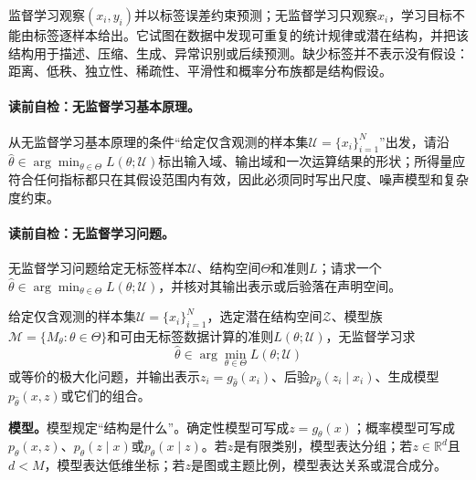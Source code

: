 \label{struct:V4-C01-CH06}
监督学习观察$(x_i,y_i)$并以标签误差约束预测；无监督学习只观察$x_i$，学习目标不能由标签逐样本给出。它试图在数据中发现可重复的统计规律或潜在结构，并把该结构用于描述、压缩、生成、异常识别或后续预测。缺少标签并不表示没有假设：距离、低秩、独立性、稀疏性、平滑性和概率分布族都是结构假设。

\paragraph{读前自检：无监督学习基本原理。}从无监督学习基本原理的条件“给定仅含观测的样本集$\mathcal U=\{x_i\}_{i=1}^{N}$”出发，请沿$\widehat\theta\in\arg\min_{\theta\in\Theta}L(\theta;\mathcal U)$标出输入域、输出域和一次运算结果的形状；所得量应符合任何指标都只在其假设范围内有效，因此必须同时写出尺度、噪声模型和复杂度约束。\par

\label{struct:V4-C01-CH07}
\paragraph{读前自检：无监督学习问题。}无监督学习问题给定无标签样本$\mathcal U$、结构空间$\Theta$和准则$L$；请求一个$\widehat\theta\in\arg\min_{\theta\in\Theta}L(\theta;\mathcal U)$，并核对其输出表示或后验落在声明空间。\par

\begin{definition}[无监督学习问题]\label{def:V4-C01-unsupervised}
给定仅含观测的样本集$\mathcal U=\{x_i\}_{i=1}^{N}$，选定潜在结构空间$\mathcal Z$、模型族$\mathcal M=\{M_\theta:\theta\in\Theta\}$和可由无标签数据计算的准则$L(\theta;\mathcal U)$，无监督学习求
\[
\widehat\theta\in\arg\min_{\theta\in\Theta}L(\theta;\mathcal U)
\]
或等价的极大化问题，并输出表示$z_i=g_{\widehat\theta}(x_i)$、后验$p_{\widehat\theta}(z_i\mid x_i)$、生成模型$p_{\widehat\theta}(x,z)$或它们的组合。
\end{definition}

\label{struct:V4-C01-CH08}
\textbf{模型。}模型规定“结构是什么”。确定性模型可写成$z=g_\theta(x)$；概率模型可写成$p_\theta(x,z)$、$p_\theta(z\mid x)$或$p_\theta(x\mid z)$。若$z$是有限类别，模型表达分组；若$z\in\mathbb R^d$且$d<M$，模型表达低维坐标；若$z$是图或主题比例，模型表达关系或混合成分。

